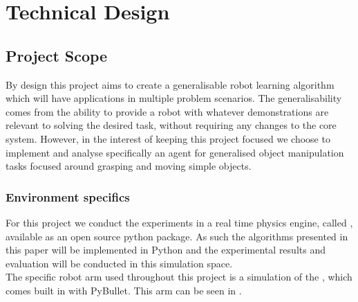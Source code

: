 \chapter{Technical Design}
\label{chap:technical}

\section{Project Scope}
By design this project aims to create a generalisable robot learning algorithm which will have applications in multiple problem scenarios. The generalisability comes from the ability to provide a robot with whatever demonstrations are relevant to solving the desired task, without requiring any changes to the core system. However, in the interest of keeping this project focused we choose to implement and analyse specifically an agent for generalised object manipulation tasks focused around grasping and moving simple objects. 
\\

\subsection{Environment specifics}
\label{subsec:pybullet-specifics}
For this project we conduct the experiments in a real time physics engine, called  \cite{pybullet}, available as an open source python package. As such the algorithms presented in this paper will be implemented in Python and the experimental results and evaluation will be conducted in this simulation space.\\
The specific robot arm used throughout this project is a simulation of the , which comes built in with PyBullet. This arm can be seen in .

